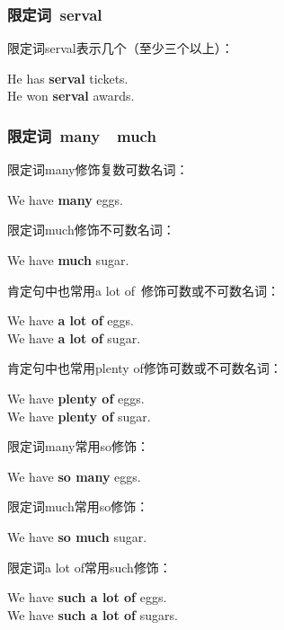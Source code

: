 \documentclass[UTF8]{ctexart}
\newcommand{\littf}[1]{{\hspace{3pt}\ttfamily #1}}
\begin{document}
\newpage

\subsubsection{限定词~\littf{serval}}
    限定词\littf{serval}表示几个（至少三个以上）：
    \begin{center}
        \large\ttfamily
        He has \textbf{serval} tickets.\\[3mm]
        He won \textbf{serval} awards.
    \end{center}

\subsubsection{限定词~\littf{many}~~\littf{much}}
    限定词\littf{many}修饰复数可数名词：
    \begin{center}
        \large\ttfamily
        We have \textbf{many} eggs.\\[6mm]
    \end{center}
    限定词\littf{much}修饰不可数名词：
    \begin{center}
        \large\ttfamily
        We have \textbf{much} sugar.\\[6mm]
    \end{center}
    肯定句中也常用\littf{a lot of~}修饰可数或不可数名词：
    \begin{center}
        \large\ttfamily
        We have \textbf{a lot of} eggs.\\[3mm]
        We have \textbf{a lot of} sugar.\\[6mm]
    \end{center}
    肯定句中也常用\littf{plenty of}修饰可数或不可数名词：
    \begin{center}
        \large\ttfamily
        We have \textbf{plenty of} eggs.\\[3mm]
        We have \textbf{plenty of} sugar.\\[6mm]
    \end{center}
    限定词\littf{many}常用\littf{so}修饰：
    \begin{center}
        \large\ttfamily
        We have \textbf{so many} eggs.\\[6mm]
    \end{center}
    限定词\littf{much}常用\littf{so}修饰：
    \begin{center}
        \large\ttfamily
        We have \textbf{so much} sugar.\\[6mm]
    \end{center}
    限定词\littf{a lot of}常用\littf{such}修饰：
    \begin{center}
        \large\ttfamily
        We have \textbf{such a lot of} eggs.\\[3mm]
        We have \textbf{such a lot of} sugars.
    \end{center}
\end{document}
